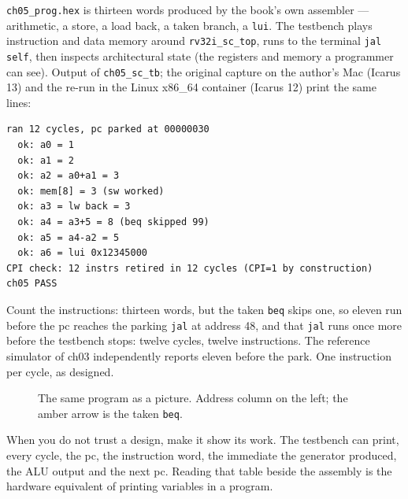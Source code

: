 \begin{example}\label{ex:run05}
\texttt{ch05\_prog.hex} is thirteen words produced by the book's own
assembler --- arithmetic, a store, a load back, a taken branch, a
\texttt{lui}. The testbench plays instruction and data memory around
\texttt{rv32i\_sc\_top}, runs to the terminal \texttt{jal self}, then
inspects architectural state (the registers and memory a programmer
can see). Output of \texttt{ch05\_sc\_tb}; the original capture on the
author's Mac (Icarus 13) and the re-run in the Linux x86\_64 container
(Icarus 12) print the same lines:
\begin{lstlisting}
ran 12 cycles, pc parked at 00000030
  ok: a0 = 1
  ok: a1 = 2
  ok: a2 = a0+a1 = 3
  ok: mem[8] = 3 (sw worked)
  ok: a3 = lw back = 3
  ok: a4 = a3+5 = 8 (beq skipped 99)
  ok: a5 = a4-a2 = 5
  ok: a6 = lui 0x12345000
CPI check: 12 instrs retired in 12 cycles (CPI=1 by construction)
ch05 PASS
\end{lstlisting}
Count the instructions: thirteen words, but the taken \texttt{beq}
skips one, so eleven run before the pc reaches the parking
\texttt{jal} at address 48, and that \texttt{jal} runs once more
before the testbench stops: twelve cycles, twelve instructions. The
reference simulator of ch03 independently reports eleven before the
park. One instruction per cycle, as designed.
\end{example}

\begin{figure}[t]
\centering

\caption[Path of the pc]{The same program as a picture. Address
column on the left; the amber arrow is the taken \texttt{beq}.}
\label{fig:pcpath05}
\end{figure}

\begin{principle}
When you do not trust a design, make it show its work. The testbench
can print, every cycle, the pc, the instruction word, the immediate
the generator produced, the ALU output and the next pc. Reading that
table beside the assembly is the hardware equivalent of printing
variables in a program.
\end{principle}

